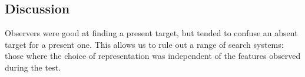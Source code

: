 \subsection{Discussion}



Observers were good at finding a present target, but tended to confuse an absent target for a present one. This allows us to rule out a range of search systems: those where the choice of representation was independent of the features observed during the test.
